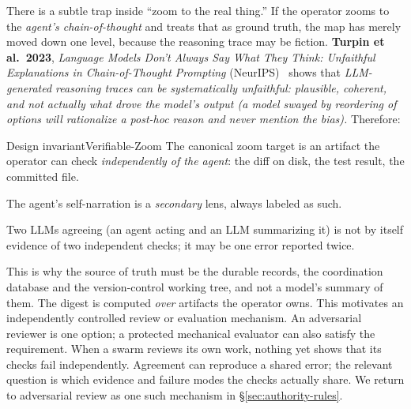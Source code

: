 \documentclass[11pt,a4paper]{article}
\theoremstyle{definition}
\theoremstyle{plain}
\begin{document}
There is a subtle trap inside ``zoom to the real thing.'' If the operator zooms to
the \emph{agent's chain-of-thought} and treats that as ground truth, the map has
merely moved down one level, because the reasoning trace may be fiction.
\textbf{Turpin et al.\ 2023}, \emph{Language Models Don't Always Say What They Think:
Unfaithful Explanations in Chain-of-Thought Prompting} (NeurIPS)~
shows that \emph{LLM-generated reasoning traces can be systematically unfaithful: plausible,
coherent, and not actually what drove the model's output (a model swayed by
reordering of options will rationalize a post-hoc reason and never mention the
bias).} Therefore:


\begin{pdclaim}{Design invariant}{Verifiable-Zoom}
\setlength{\parskip}{4pt plus 1pt}
\label{prop:verifiable-zoom}
The canonical zoom target is an artifact the operator can check
\emph{independently of the agent}: the diff on disk, the test result, the
committed file.

The agent's self-narration is a \emph{secondary} lens, always
labeled as such.

Two LLMs agreeing (an agent acting and an LLM summarizing it) is
not by itself evidence of two independent checks; it may be one error reported twice.
\end{pdclaim}

This is why the source of truth must be the durable records, the coordination
database and the version-control working tree, and not a model's summary of them.
The digest is computed \emph{over} artifacts the operator owns. This motivates
an independently controlled review or evaluation mechanism. An adversarial
reviewer is one option; a protected mechanical evaluator can also satisfy the
requirement. When a swarm reviews its own work, nothing yet shows that its
checks fail independently. Agreement can reproduce a shared error; the relevant
question is which evidence and failure modes the checks actually share. We
return to adversarial review as one such mechanism in
\S\ref{sec:authority-rules}.

\end{document}
